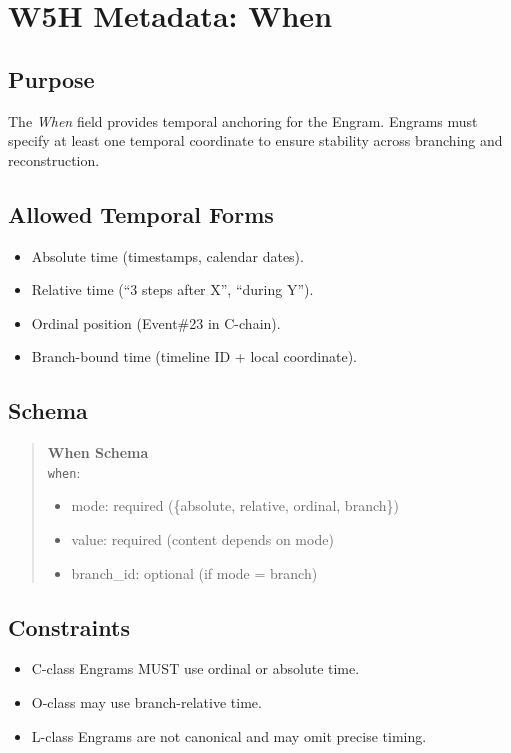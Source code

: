 \chapter{W5H Metadata: When}
\label{chap:W5H_When}

\section{Purpose}

The \emph{When} field provides temporal anchoring for the Engram. Engrams must
specify at least one temporal coordinate to ensure stability across branching
and reconstruction.

\section{Allowed Temporal Forms}

\begin{itemize}
    \item Absolute time (timestamps, calendar dates).
    \item Relative time (``3 steps after X'', ``during Y'').
    \item Ordinal position (Event\#23 in C-chain).
    \item Branch-bound time (timeline ID + local coordinate).
\end{itemize}

\section{Schema}

\begin{quote}
\textbf{When Schema}\\
\texttt{when}: 
\begin{itemize}
    \item mode: required (\{absolute, relative, ordinal, branch\})
    \item value: required (content depends on mode)
    \item branch\_id: optional (if mode = branch)
\end{itemize}
\end{quote}

\section{Constraints}

\begin{itemize}
    \item C-class Engrams MUST use ordinal or absolute time.
    \item O-class may use branch-relative time.
    \item L-class Engrams are not canonical and may omit precise timing.
\end{itemize}

